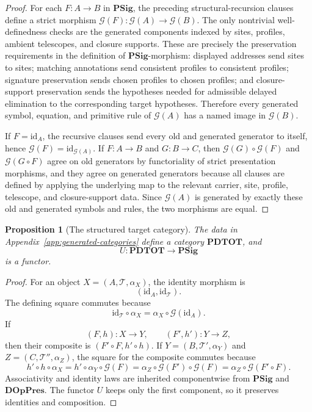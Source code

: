 \documentclass[11pt]{article}
\newtheorem{proposition}[definition]{Proposition}
\begin{document}
\begin{proof}
For each \(F:A\to B\) in \(\mathbf{PSig}\), the preceding structural-recursion
clauses define a strict morphism \(\mathcal{G}(F):\mathcal{G}(A)\to
\mathcal{G}(B)\).  The only nontrivial well-definedness checks are the
generated components indexed by sites, profiles, ambient telescopes, and closure
supports.  These are precisely the preservation requirements in the definition
of \(\mathbf{PSig}\)-morphism: displayed addresses send sites to sites;
matching annotations send consistent profiles to consistent profiles; signature
preservation sends chosen profiles to chosen profiles; and closure-support
preservation sends the hypotheses needed for admissible delayed elimination to the
corresponding target hypotheses.  Therefore every generated
symbol, equation, and primitive rule of \(\mathcal{G}(A)\) has a named image in
\(\mathcal{G}(B)\).

If \(F=\mathrm{id}_A\), the recursive clauses send every old and generated
generator to itself, hence \(\mathcal{G}(F)=\mathrm{id}_{\mathcal{G}(A)}\).  If
\(F:A\to B\) and \(G:B\to C\), then \(\mathcal{G}(G)\circ\mathcal{G}(F)\) and
\(\mathcal{G}(G\circ F)\) agree on old generators by functoriality of strict
presentation morphisms, and they agree on generated generators because all
clauses are defined by applying the underlying map to the relevant carrier,
site, profile, telescope, and closure-support data.  Since \(\mathcal{G}(A)\)
is generated by exactly these old and generated symbols and rules, the two
morphisms are equal.
\end{proof}

\begin{proposition}[The structured target category]
The data in Appendix~\ref{app:generated-categories} define a category
\(\mathbf{PDTOT}\), and
\[
  U:\mathbf{PDTOT}\longrightarrow\mathbf{PSig}
\]
is a functor.
\end{proposition}

\begin{proof}
For an object \(X=(A,\mathcal{T},\alpha_X)\), the identity morphism is
\[
  (\mathrm{id}_A,\mathrm{id}_{\mathcal{T}}).
\]
The defining square commutes because
\[
  \mathrm{id}_{\mathcal{T}}\circ\alpha_X
  =
  \alpha_X\circ\mathcal{G}(\mathrm{id}_A).
\]
If
\[
  (F,h):X\to Y,
  \qquad
  (F',h'):Y\to Z,
\]
then their composite is \((F'\circ F,h'\circ h)\).  If
\(Y=(B,\mathcal{T}',\alpha_Y)\) and
\(Z=(C,\mathcal{T}'',\alpha_Z)\), the square for the composite commutes because
\[
  h'\circ h\circ\alpha_X
  =
  h'\circ\alpha_Y\circ\mathcal{G}(F)
  =
  \alpha_Z\circ\mathcal{G}(F')\circ\mathcal{G}(F)
  =
  \alpha_Z\circ\mathcal{G}(F'\circ F).
\]
Associativity and identity laws are inherited componentwise from
\(\mathbf{PSig}\) and \(\mathbf{DOpPres}\).  The functor \(U\) keeps only the
first component, so it preserves identities and composition.
\end{proof}
\end{document}
